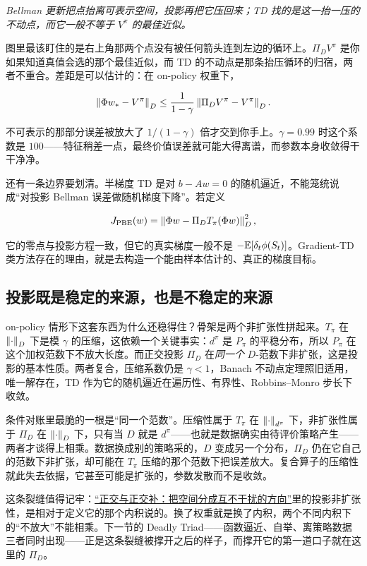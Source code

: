 \emph{Bellman 更新把点抬离可表示空间，投影再把它压回来；TD 找的是这一抬一压的不动点，而它一般不等于 \(V^\pi\) 的最佳近似。}

图里最该盯住的是右上角那两个点没有被任何箭头连到左边的循环上。\(\Pi_DV^\pi\) 是你如果知道真值会选的那个最佳近似，而 TD 的不动点是那条抬压循环的归宿，两者不重合。差距是可以估计的：在 on-policy 权重下，

\[
\left\lVert\Phi w_*-V^\pi\right\rVert_D
\le
\frac{1}{1-\gamma}\left\lVert\Pi_DV^\pi-V^\pi\right\rVert_D .
\]

不可表示的那部分误差被放大了 \(1/(1-\gamma)\) 倍才交到你手上。\(\gamma=0.99\) 时这个系数是 \(100\)——特征稍差一点，最终价值误差就可能大得离谱，而参数本身收敛得干干净净。

还有一条边界要划清。半梯度 TD 是对 \(b-Aw=0\) 的随机逼近，不能笼统说成``对投影 Bellman 误差做随机梯度下降''。若定义

\[
J_{\mathrm{PBE}}(w)=\left\lVert\Phi w-\Pi_DT_\pi(\Phi w)\right\rVert_D^2,
\]

它的零点与投影方程一致，但它的真实梯度一般不是 \(-\mathbb{E}[\delta_t\phi(S_t)]\)。Gradient-TD 类方法存在的理由，就是去构造一个能由样本估计的、真正的梯度目标。

\subsection{投影既是稳定的来源，也是不稳定的来源}

on-policy 情形下这套东西为什么还稳得住？骨架是两个非扩张性拼起来。\(T_\pi\) 在 \(\left\lVert\cdot\right\rVert_D\) 下是模 \(\gamma\) 的压缩，这依赖一个关键事实：\(d^\pi\) 是 \(P_\pi\) 的平稳分布，所以 \(P_\pi\) 在这个加权范数下不放大长度。而正交投影 \(\Pi_D\) 在\emph{同一个} \(D\)-范数下非扩张，这是投影的基本性质。两者复合，压缩系数仍是 \(\gamma<1\)，Banach 不动点定理照旧适用，唯一解存在，TD 作为它的随机逼近在遍历性、有界性、Robbins--Monro 步长下收敛。

条件对账里最脆的一根是``同一个范数''。压缩性属于 \(T_\pi\) 在 \(\left\lVert\cdot\right\rVert_{d^\pi}\) 下，非扩张性属于 \(\Pi_D\) 在 \(\left\lVert\cdot\right\rVert_D\) 下，只有当 \(D\) 就是 \(d^\pi\)——也就是数据确实由待评价策略产生——两者才谈得上相乘。数据换成别的策略采的，\(D\) 变成另一个分布，\(\Pi_D\) 仍在它自己的范数下非扩张，却可能在 \(T_\pi\) 压缩的那个范数下把误差放大。复合算子的压缩性就此失去依据，它甚至可能是扩张的，参数发散而不是收敛。

这条裂缝值得记牢：\hyperref[sec:03-Linear-Algebra/03-Orthogonality/01]{``正交与正交补：把空间分成互不干扰的方向''}里的投影非扩张性，是相对于定义它的那个内积说的。换了权重就是换了内积，两个不同内积下的``不放大''不能相乘。下一节的 Deadly Triad——函数逼近、自举、离策略数据三者同时出现——正是这条裂缝被撑开之后的样子，而撑开它的第一道口子就在这里的 \(\Pi_D\)。

